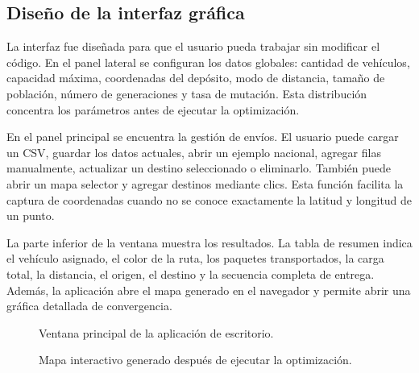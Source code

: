 \documentclass[runningheads]{llncs}
\begin{document}
\subsection{Dise\~no de la interfaz gr\'afica}

La interfaz fue dise\~nada para que el usuario pueda trabajar sin modificar el
c\'odigo. En el panel lateral se configuran los datos globales: cantidad de
veh\'iculos, capacidad m\'axima, coordenadas del dep\'osito, modo de distancia,
tama\~no de poblaci\'on, n\'umero de generaciones y tasa de mutaci\'on. Esta
distribuci\'on concentra los par\'ametros antes de ejecutar la optimizaci\'on.

En el panel principal se encuentra la gesti\'on de env\'ios. El usuario puede
cargar un CSV, guardar los datos actuales, abrir un ejemplo nacional, agregar
filas manualmente, actualizar un destino seleccionado o eliminarlo. Tambi\'en
puede abrir un mapa selector y agregar destinos mediante clics. Esta funci\'on
facilita la captura de coordenadas cuando no se conoce exactamente la latitud y
longitud de un punto.

La parte inferior de la ventana muestra los resultados. La tabla de resumen
indica el veh\'iculo asignado, el color de la ruta, los paquetes transportados,
la carga total, la distancia, el origen, el destino y la secuencia completa de
entrega. Adem\'as, la aplicaci\'on abre el mapa generado en el navegador y permite
abrir una gr\'afica detallada de convergencia.

\begin{figure}
\centering
{}
\caption{Ventana principal de la aplicaci\'on de escritorio.}
\label{fig:ventana-principal}
\end{figure}

\begin{figure}
\centering
{}
\caption{Mapa interactivo generado despu\'es de ejecutar la optimizaci\'on.}
\label{fig:mapa-rutas}
\end{figure}
\end{document}
